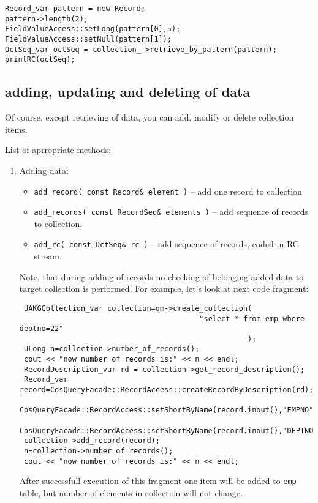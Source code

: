 \begin{verbatim}
Record_var pattern = new Record;
pattern->length(2);
FieldValueAccess::setLong(pattern[0],5);
FieldValueAccess::setNull(pattern[1]);
OctSeq_var octSeq = collection_->retrieve_by_pattern(pattern);
printRC(octSeq);
\end{verbatim}

\subsection{ adding, updating and deleting of data }

  Of course, except retrieving of data, you can add, modify or delete collection items.

 List of aprropriate methods:
 \begin{enumerate}
  \item Adding data:
     \begin{itemize}
       \item \verb|add_record( const Record& element )| -- add one record to collection
       \item \verb|add_records( const RecordSeq& elements )| -- add sequence of records to collection.
       \item \verb|add_rc( const OctSeq& rc )| -- add sequence of records, coded in RC stream. 
     \end{itemize}

Note, that during adding of records no checking of belonging added data to 
target collection is performed.
For example, let's look at next code fragment:
\begin{verbatim}
 UAKGCollection_var collection=qm->create_collection(
                                         "select * from emp where deptno=22"
                                                    );
 ULong n=collection->number_of_records();
 cout << "now number of records is:" << n << endl;
 RecordDescription_var rd = collection->get_record_description();
 Record_var record=CosQueryFacade::RecordAccess::createRecordByDescription(rd);
 CosQueryFacade::RecordAccess::setShortByName(record.inout(),"EMPNO",11,rd);
 CosQueryFacade::RecordAccess::setShortByName(record.inout(),"DEPTNO",11,rd);
 collection->add_record(record);
 n=collection->number_of_records();
 cout << "now number of records is:" << n << endl;
\end{verbatim} 
 After successfull execution of this fragment one item will be added to \verb|emp| table, but number of elements in collection will not change.


\end{enumerate}
